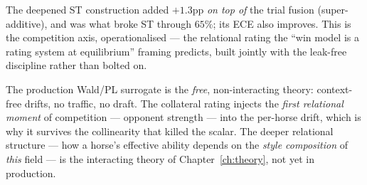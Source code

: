 The deepened ST construction added $+1.3$pp \emph{on top of} the trial fusion (super-additive),
and was what broke ST through $65\%$; its ECE also improves. This is the competition axis,
operationalised --- the relational rating the ``win model is a rating system at equilibrium''
framing predicts, built jointly with the leak-free discipline rather than bolted on.

\begin{remark}
The production Wald/PL surrogate is the \emph{free}, non-interacting theory: context-free drifts,
no traffic, no draft. The collateral rating injects the \emph{first relational moment} of
competition --- opponent strength --- into the per-horse drift, which is why it survives the
collinearity that killed the scalar. The deeper relational structure --- how a horse's effective
ability depends on the \emph{style composition} of \emph{this} field --- is the interacting theory
of Chapter~\ref{ch:theory}, not yet in production.
\end{remark}
